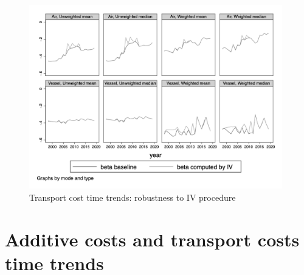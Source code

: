 \documentclass[a4paper,11pt]{article}
\begin{document}
\begin{figure}[htbp]
\caption{Transport cost time trends: robustness to IV procedure}
\label{fig:comp_IV_SITC5}
\begin{center}
\includegraphics[height=8cm]
{scatter_chronology_baseline_IV_ref1_y_5_3.png}
\end{center}
\end{figure}







\section{Additive costs and transport costs time trends}\label{sec:results_trends}
\end{document}
